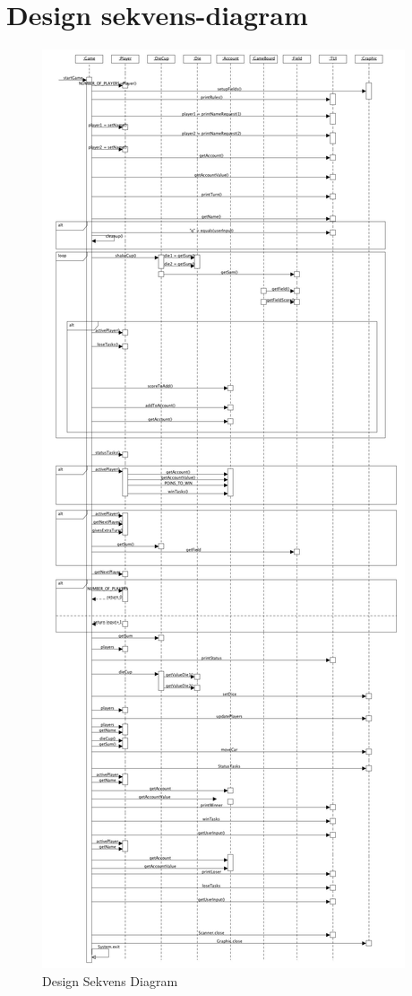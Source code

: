 \section{Design sekvens-diagram}
\begin{figure}[!ht]
\centering
\includegraphics[scale=0.14]{DesignSequenceDiagram.jpg}
\caption[<Text for the list of figures>]{Design Sekvens Diagram}
\label{fig:figure2}
\end{figure}

